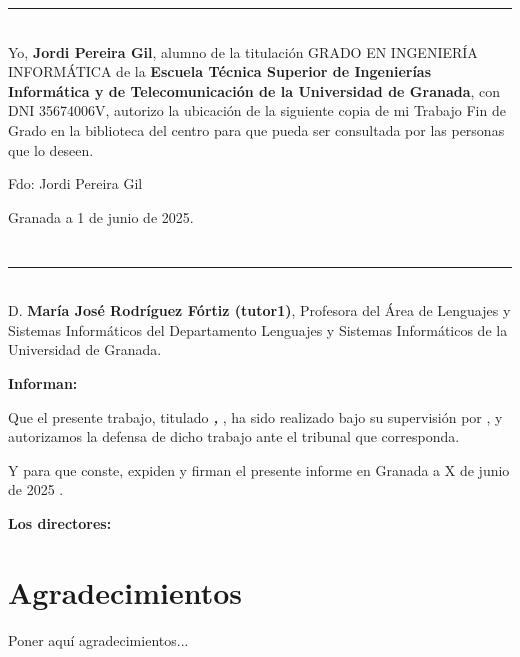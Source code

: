 \noindent\rule[-1ex]{\textwidth}{2pt}\\[4.5ex]

Yo, \textbf{Jordi Pereira Gil}, alumno de la titulación GRADO EN INGENIERÍA INFORMÁTICA de la \textbf{Escuela Técnica Superior
de Ingenierías Informática y de Telecomunicación de la Universidad de Granada}, con DNI 35674006V, autorizo la
ubicación de la siguiente copia de mi Trabajo Fin de Grado en la biblioteca del centro para que pueda ser
consultada por las personas que lo deseen.

\vspace{6cm}

\noindent Fdo: Jordi Pereira Gil

\vspace{2cm}

\begin{flushright}
Granada a 1 de junio de 2025.
\end{flushright}


\chapter*{}
\thispagestyle{empty}

\noindent\rule[-1ex]{\textwidth}{2pt}\\[4.5ex]

D. \textbf{	María José Rodríguez Fórtiz (tutor1)}, Profesora del Área de Lenguajes y Sistemas Informáticos del Departamento Lenguajes y Sistemas Informáticos de la Universidad de Granada.

\vspace{0.5cm}


\vspace{0.5cm}

\textbf{Informan:}

\vspace{0.5cm}

Que el presente trabajo, titulado \textit{\textbf{\myTitle, \mySubTitle}},
ha sido realizado bajo su supervisión por \textbf{\myName}, y autorizamos la defensa de dicho trabajo ante el tribunal
que corresponda.

\vspace{0.5cm}

Y para que conste, expiden y firman el presente informe en Granada a X de junio de 2025 .

\vspace{1cm}

\textbf{Los directores:}

\vspace{5cm}

\noindent \textbf{\myProf}

\chapter*{Agradecimientos}
\thispagestyle{empty}

       \vspace{1cm}


Poner aquí agradecimientos...

